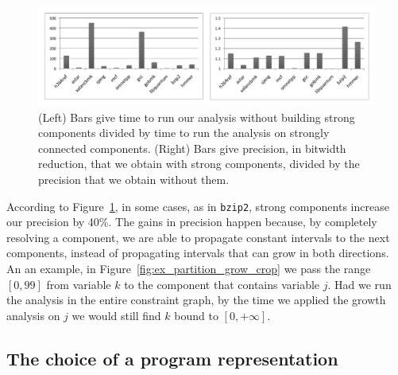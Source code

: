 \documentclass{llncs}
\begin{document}
\begin{figure}[t!]
\begin{center}
\includegraphics[width=\textwidth]{images/impactSCC}
\end{center}
\caption{\label{fig:impactSCC}
(Left) Bars give time to run our analysis without building strong components
divided by time to run the analysis on strongly connected components.
(Right) Bars give precision, in bitwidth reduction, that we obtain with strong
components, divided by the precision that we obtain without them.
}
\end{figure}

According to Figure~\ref{fig:impactSCC}, in some cases, as in \texttt{bzip2},
strong components increase our precision by 40\%.
The gains in precision happen because, by completely resolving a component,
we are able to propagate constant intervals to the next components, instead
of propagating intervals that can grow in both directions.
An an example, in Figure~\ref{fig:ex_partition_grow_crop} we pass the range
$[0, 99]$ from variable $k$ to the component that contains variable $j$.
Had we run the analysis in the entire constraint graph, by the time we
applied the growth analysis on $j$ we would still find $k$ bound to
$[0, +\infty]$.


\subsection{The choice of a program representation}
\label{sub:program_rep}
\end{document}
